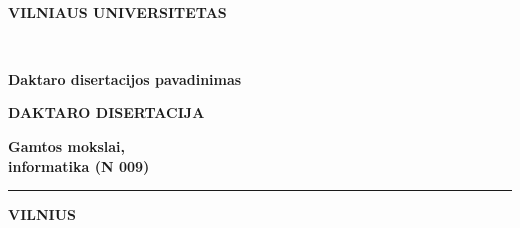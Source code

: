 \newpage
\thispagestyle{empty}                   %
{\selectfont
\begin{flushright}
\thesisDOI \\
\thesisORCID

\end{flushright}
\begin{center}
	\vspace*{5mm}	
	   \begin{flushleft} 
	\renewcommand\bfdefault{m} 
	\bf \large
	VILNIAUS UNIVERSITETAS \\
	   \end{flushleft} 	

	
	\vspace{50mm}
	
	\begin{flushleft}
\renewcommand\bfdefault{m} \bf
	{\Large \bf  \thesisAuthorName  \\ \MakeUppercase{\thesisAuthorSurname} \par}
\end{flushleft}
	\vspace{10mm}
	\begin{flushleft}
	{\huge 
    \renewcommand\bfdefault{m}
    \bf
    Daktaro disertacijos pavadinimas
	}
	\end{flushleft}
  \vspace{5mm}
  	\begin{flushleft}
  	{\bf DAKTARO DISERTACIJA}\\%
  	\end{flushleft}
  \vspace{15mm}
    	\begin{flushleft}
\renewcommand\bfdefault{m} \bf
  Gamtos mokslai,\\
  informatika (N 009)
  	\end{flushleft}
     \begin{flushleft} 
	\noindent\rule{3cm}{0.4pt}
\end{flushleft} 
\begin{flushleft} 
\renewcommand\bfdefault{m} \bf
	VILNIUS \thesisYear
\end{flushleft} 
\end{center}
}
\newpage
\thispagestyle{empty}                   %

